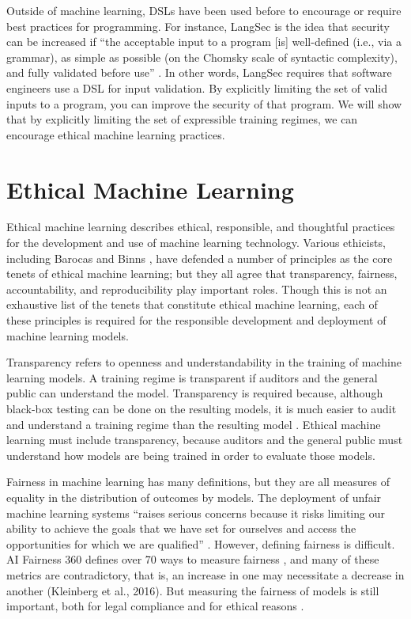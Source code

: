 \documentclass[letterpaper]{article}
\newcommand{\citep}[1]{\cite{#1}}
\begin{document}
Outside of machine learning, DSLs have been used before to encourage or require best practices for programming. For instance, LangSec is the idea that security can be increased if ``the acceptable input to a program [is] well-defined (i.e., via a grammar), as simple as possible (on the Chomsky scale of syntactic complexity), and fully validated before use'' \citep{Momot2016}. In other words, LangSec requires that software engineers use a DSL for input validation. By explicitly limiting the set of valid inputs to a program, you can improve the security of that program. We will show that by explicitly limiting the set of expressible training regimes, we can encourage ethical machine learning practices.

\section{Ethical Machine Learning}
Ethical machine learning describes ethical, responsible, and thoughtful practices for the development and use of machine learning technology. Various ethicists, including Barocas  and Binns , have defended a number of principles as the core tenets of ethical machine learning; but they all agree that transparency, fairness, accountability, and reproducibility play important roles. Though this is not an exhaustive list of the tenets that constitute ethical machine learning, each of these principles is required for the responsible development and deployment of machine learning models.

Transparency refers to openness and understandability in the training of machine learning models. A training regime is transparent if auditors and the general public can understand the model. Transparency is required because, although black-box testing can be done on the resulting models, it is much easier to audit and understand a training regime than the resulting model \citep{DeLaat2018}. Ethical machine learning must include transparency, because auditors and the general public must understand how models are being trained in order to evaluate those models.

Fairness in machine learning has many definitions, but they are all measures of equality in the distribution of outcomes by models. The deployment of unfair machine learning systems ``raises serious concerns because it risks limiting our ability to achieve the goals that we have set for ourselves and access the opportunities for which we are qualified'' \citep{Barocas2019}. However, defining fairness is difficult. AI Fairness 360 defines over 70 ways to measure fairness \citep{Bellamy2018}, and many of these metrics are contradictory, that is, an increase in one may necessitate a decrease in another (Kleinberg et al., 2016). But measuring the fairness of models is still important, both for legal compliance \citep{Barocas2016} and for ethical reasons \citep{Binns2018}.
\end{document}
